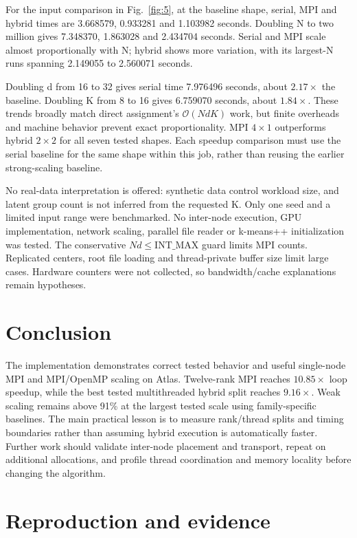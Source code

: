 \documentclass[conference,a4paper,10pt]{IEEEtran}
\begin{document}
For the input comparison in Fig.~\ref{fig:5}, at the baseline shape, serial, MPI and hybrid times are 3.668579, 0.933281 and 1.103982 seconds. Doubling N to two million gives 7.348370, 1.863028 and 2.434704 seconds. Serial and MPI scale almost proportionally with N; hybrid shows more variation, with its largest-N runs spanning 2.149055 to 2.560071 seconds.


Doubling d from 16 to 32 gives serial time 7.976496 seconds, about $2.17\times$ the baseline. Doubling K from 8 to 16 gives 6.759070 seconds, about $1.84\times$. These trends broadly match direct assignment's $\mathcal{O}(NdK)$ work, but finite overheads and machine behavior prevent exact proportionality. MPI $4\times1$ outperforms hybrid $2\times2$ for all seven tested shapes. Each speedup comparison must use the serial baseline for the same shape within this job, rather than reusing the earlier strong-scaling baseline.

No real-data interpretation is offered: synthetic data control workload size, and latent group count is not inferred from the requested K. Only one seed and a limited input range were benchmarked. No inter-node execution, GPU implementation, network scaling, parallel file reader or k-means++ initialization was tested. The conservative $Nd\leq\mathrm{INT\_MAX}$ guard limits MPI counts. Replicated centers, root file loading and thread-private buffer size limit large cases. Hardware counters were not collected, so bandwidth/cache explanations remain hypotheses.

\section{Conclusion}

The implementation demonstrates correct tested behavior and useful single-node MPI and MPI/OpenMP scaling on Atlas. Twelve-rank MPI reaches $10.85\times$ loop speedup, while the best tested multithreaded hybrid split reaches $9.16\times$. Weak scaling remains above 91\% at the largest tested scale using family-specific baselines. The main practical lesson is to measure rank/thread splits and timing boundaries rather than assuming hybrid execution is automatically faster. Further work should validate inter-node placement and transport, repeat on additional allocations, and profile thread coordination and memory locality before changing the algorithm.

\section{Reproduction and evidence}
\end{document}
